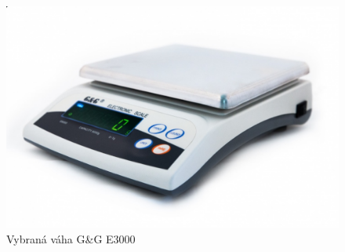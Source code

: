 \begin{figure}[!h]
    \begin{center}
        \includegraphics[scale=0.25]{obrazky/E3000.png}
    \end{center}
    \caption{Vybraná váha G\&G E3000 \cite{vaha}}
\end{figure}








